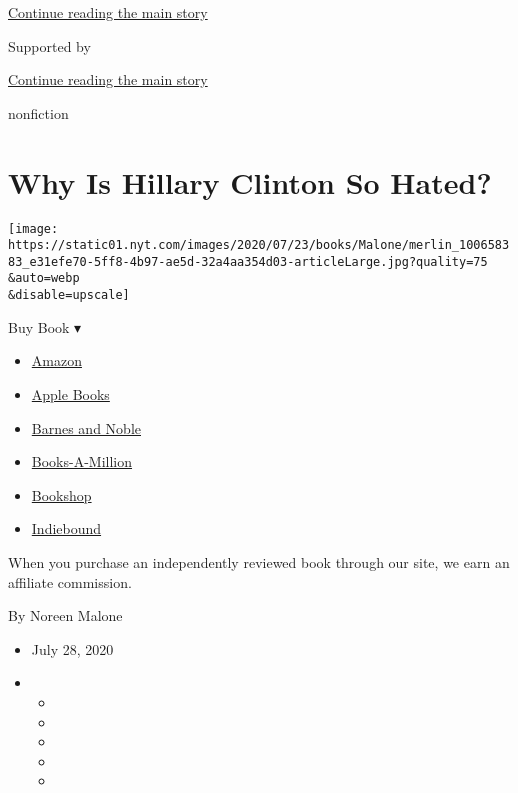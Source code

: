 \protect\hyperlink{after-top}{Continue reading the main story}

Supported by

\protect\hyperlink{after-sponsor}{Continue reading the main story}

nonfiction

\hypertarget{why-is-hillary-clinton-so-hated}{%
\section{Why Is Hillary Clinton So
Hated?}\label{why-is-hillary-clinton-so-hated}}

\texttt{[image: https://static01.nyt.com/images/2020/07/23/books/Malone/merlin\_100658383\_e31efe70-5ff8-4b97-ae5d-32a4aa354d03-articleLarge.jpg?quality=75\\\&auto=webp\\\&disable=upscale]}

Buy Book ▾

\begin{itemize}
\tightlist
\item
  \href{https://www.amazon.com/gp/search?index=books\&tag=NYTBSREV-20\&field-keywords=The+Hunting+of+Hillary+Michael+D\%27Antonio}{Amazon}
\item
  \href{https://du-gae-books-dot-nyt-du-prd.appspot.com/buy?title=The+Hunting+of+Hillary\&author=Michael+D\%27Antonio}{Apple
  Books}
\item
  \href{https://www.anrdoezrs.net/click-7990613-11819508?url=https\%3A\%2F\%2Fwww.barnesandnoble.com\%2Fw\%2F\%3Fean\%3D9731250154606}{Barnes
  and Noble}
\item
  \href{https://www.anrdoezrs.net/click-7990613-35140?url=https\%3A\%2F\%2Fwww.booksamillion.com\%2Fp\%2FThe\%2BHunting\%2Bof\%2BHillary\%2FMichael\%2BD\%2527Antonio\%2F9731250154606}{Books-A-Million}
\item
  \href{https://bookshop.org/a/3546/9731250154606}{Bookshop}
\item
  \href{https://www.indiebound.org/book/9731250154606?aff=NYT}{Indiebound}
\end{itemize}

When you purchase an independently reviewed book through our site, we
earn an affiliate commission.

By Noreen Malone

\begin{itemize}
\item
  July 28, 2020
\item
  \begin{itemize}
  \item
  \item
  \item
  \item
  \item
  \end{itemize}
\end{itemize}

